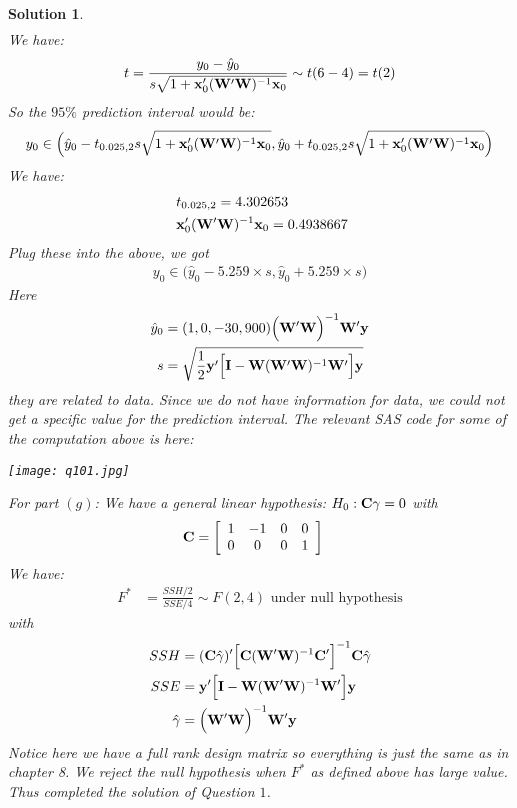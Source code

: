 \documentclass[11pt]{article}
\newtheorem{sol}{Solution}
\begin{document}
\begin{sol}
\begin{align*}
  \end{align*}
  We have:
  \begin{align*}
  	t = \frac{y_0  - \hat{y}_0}{s\sqrt{1 + {\bf x}_0'({\bf W}'{\bf W})^{-1}{\bf x}_0 }} \sim t(6 - 4) = t(2)
  \end{align*}
  So the $95\%$ prediction interval would be:
  \begin{align*}
  	y_0 \in \Big(\hat{y}_0 - t_{0.025, 2}s\sqrt{1 + {\bf x}_0'({\bf W}'{\bf W})^{-1}{\bf x}_0 }, \hat{y}_0 + t_{0.025, 2}s\sqrt{1 + {\bf x}_0'({\bf W}'{\bf W})^{-1}{\bf x}_0 }\Big)
  \end{align*}
  We have:
  \begin{align*}
  	&\ t_{0.025, 2} = 4.302653\\
  	&\ {\bf x}_0'({\bf W}'{\bf W})^{-1}{\bf x}_0 = 0.4938667
  \end{align*}
  Plug these into the above, we got
  \begin{align*}
  	y_0 \in \Big(\hat{y}_0 - 5.259\times s, \hat{y}_0 + 5.259 \times s\Big)
  \end{align*}
  Here 
  \begin{align*}
  	\hat{y}_0 &= (1, 0, -30, 900)\Big({\bf W}'{\bf W}\Big)^{-1}{\bf W}'{\bf y}\\
  	s &= \sqrt{\frac{1}{2}{\bf y}'\Big[{\bf I} - {\bf W}({\bf W}'{\bf W})^{-1}{\bf W}'\Big]{\bf y}}
  \end{align*}
  they are related to data. Since we do not have information for data, we could not get a specific value for the prediction interval.
  The relevant SAS code for some of the computation above is here:
  \begin{center}
  	\texttt{[image: q101.jpg]}
  \end{center}
  For part $(g)$:\vskip 2mm
  We have a general linear hypothesis: $H_0: {\bf C}{\bf \gamma} = 0$ with
  \begin{align*}
  	{\bf C} &= \left[\begin{array}{cccc} 1&-1&0&0\\ 0&0&0&1\end{array}\right]
  \end{align*}
  We have:
  \begin{align*}
  	F^{\ast} &= \frac{SSH/2}{SSE/4} \sim F(2, 4)  \text{ under null hypothesis}
  \end{align*}
  with 
  \begin{align*}
  	SSH &= ({\bf C}\hat{\gamma})'\Big[{\bf C}({\bf W}'{\bf W})^{-1}{\bf C}'\Big]^{-1}{\bf C}\hat{\gamma}\\
  	SSE &= {\bf y}'\Big[{\bf I} - {\bf W}({\bf W}'{\bf W})^{-1}{\bf W}'\Big]{\bf y}\\
  	\hat{{\bf \gamma}} &= \Big({\bf W}'{\bf W}\Big)^{-1}{\bf W}'{\bf y}
  \end{align*}
  Notice here we have a full rank design matrix so everything is just the same as in chapter 8. We reject the null hypothesis when $F^{\ast}$ as defined above has large value.\vskip 2mm
  Thus completed the solution of Question $1$.
\end{sol}
\end{document}
